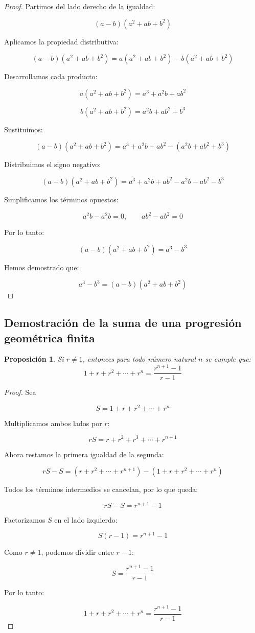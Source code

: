 \documentclass[12pt,final]{report}
\theoremstyle{plain}
\newtheorem{proposition}[theorem]{Proposición}
\theoremstyle{definition}
\begin{document}
\begin{proof}

Partimos del lado derecho de la igualdad:

\[
(a-b)(a^2+ab+b^2)
\]

Aplicamos la propiedad distributiva:

\[
(a-b)(a^2+ab+b^2)=a(a^2+ab+b^2)-b(a^2+ab+b^2)
\]

Desarrollamos cada producto:

\[
a(a^2+ab+b^2)=a^3+a^2b+ab^2
\]

\[
b(a^2+ab+b^2)=a^2b+ab^2+b^3
\]

Sustituimos:

\[
(a-b)(a^2+ab+b^2)=a^3+a^2b+ab^2-(a^2b+ab^2+b^3)
\]

Distribuimos el signo negativo:

\[
(a-b)(a^2+ab+b^2)=a^3+a^2b+ab^2-a^2b-ab^2-b^3
\]

Simplificamos los términos opuestos:

\[
a^2b-a^2b=0, \qquad ab^2-ab^2=0
\]

Por lo tanto:

\[
(a-b)(a^2+ab+b^2)=a^3-b^3
\]

Hemos demostrado que:

\[
a^3-b^3=(a-b)(a^2+ab+b^2)
\]

\end{proof}

\newpage


\subsection{Demostración de la suma de una progresión geométrica finita}

\begin{proposition}
Si $r \neq 1$, entonces para todo número natural $n$ se cumple que:
\[
1+r+r^2+\cdots+r^n=\frac{r^{n+1}-1}{r-1}
\]
\end{proposition}

\begin{proof}

Sea

\[
S=1+r+r^2+\cdots+r^n
\]

Multiplicamos ambos lados por $r$:

\[
rS=r+r^2+r^3+\cdots+r^{n+1}
\]

Ahora restamos la primera igualdad de la segunda:

\[
rS-S=(r+r^2+\cdots+r^{n+1})-(1+r+r^2+\cdots+r^n)
\]

Todos los términos intermedios se cancelan, por lo que queda:

\[
rS-S=r^{n+1}-1
\]

Factorizamos $S$ en el lado izquierdo:

\[
S(r-1)=r^{n+1}-1
\]

Como $r\neq 1$, podemos dividir entre $r-1$:

\[
S=\frac{r^{n+1}-1}{r-1}
\]

Por lo tanto:

\[
1+r+r^2+\cdots+r^n=\frac{r^{n+1}-1}{r-1}
\]

\end{proof}
\end{document}
